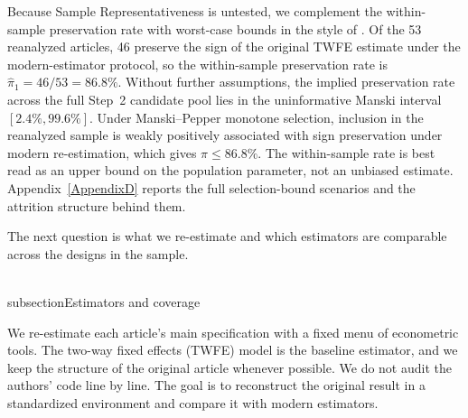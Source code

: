 \documentclass[11pt]{article}
\begin{document}
Because Sample Representativeness is untested, we complement the within-sample preservation rate with worst-case bounds in the style of \textcite{manski1989anatomy}. Of the 53 reanalyzed articles, 46 preserve the sign of the original TWFE estimate under the modern-estimator protocol, so the within-sample preservation rate is $\hat\pi_1 = 46/53 = 86.8\%$. Without further assumptions, the implied preservation rate across the full Step~2 candidate pool lies in the uninformative Manski interval $[2.4\%, 99.6\%]$. Under Manski--Pepper monotone selection, inclusion in the reanalyzed sample is weakly positively associated with sign preservation under modern re-estimation, which gives $\pi \leq 86.8\%$. The within-sample rate is best read as an upper bound on the population parameter, not an unbiased estimate. Appendix~\ref{AppendixD} reports the full selection-bound scenarios and the attrition structure behind them.

The next question is what we re-estimate and which estimators are comparable across the designs in the sample.


\\subsection{Estimators and coverage}

We re-estimate each article's main specification with a fixed menu of econometric tools. The two-way fixed effects (TWFE) model is the baseline estimator, and we keep the structure of the original article whenever possible. We do not audit the authors' code line by line. The goal is to reconstruct the original result in a standardized environment and compare it with modern estimators.
\end{document}
